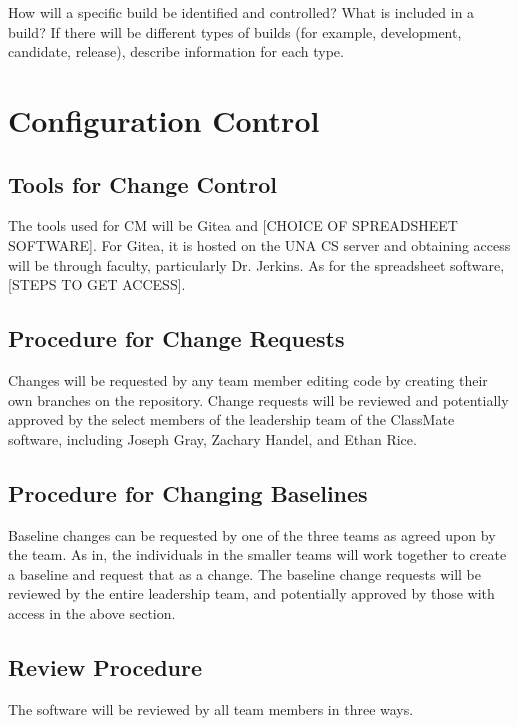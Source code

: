 \documentclass[letterpaper,12pt,oneside,listof=totoc]{scrreprt}
\begin{document}
How will a specific build be identified and controlled? What is included in a build? If there will be different types of builds (for example, development, candidate, release), describe information for each type.

\section{Configuration Control}

\subsection{Tools for Change Control}

The tools used for CM will be Gitea and [CHOICE OF SPREADSHEET SOFTWARE]. For Gitea, it is hosted on the UNA CS server and obtaining access will be through faculty, particularly Dr. Jerkins. As for the spreadsheet software, [STEPS TO GET ACCESS].

\subsection{Procedure for Change Requests}

Changes will be requested by any team member editing code by creating their own branches on the repository. Change requests will be reviewed and potentially approved by the select members of the leadership team of the ClassMate software, including Joseph Gray, Zachary Handel, and Ethan Rice. 

\subsection{Procedure for Changing Baselines}

Baseline changes can be requested by one of the three teams as agreed upon by the team. As in, the individuals in the smaller teams will work together to create a baseline and request that as a change. The baseline change requests will be reviewed by the entire leadership team, and potentially approved by those with access in the above section.

\subsection{Review Procedure}

The software will be reviewed by all team members in three ways.
\end{document}
